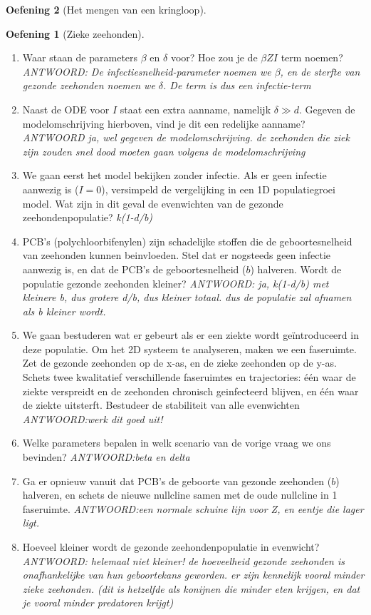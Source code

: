 \documentclass[
  a4paper,
]{scrbook}
\theoremstyle{definition}
\newtheorem{exercise}{Oefening}[chapter]
\theoremstyle{remark}
\begin{document}
\begin{exercise}[Het mengen van een
kringloop]
\begin{exercise}[Zieke
zeehonden]
\begin{enumerate}
\def\labelenumi{\alph{enumi}.}
\item
  Waar staan de parameters \(\beta\) en \(\delta\) voor? Hoe zou je de
  \(\beta ZI\) term noemen? \emph{ANTWOORD: De
  infectiesnelheid-parameter noemen we \(\beta\), en de sterfte van
  gezonde zeehonden noemen we \(\delta\). De term is dus een
  infectie-term}
\item
  Naast de ODE voor \(I\) staat een extra aanname, namelijk
  \(\delta \gg d\). Gegeven de modelomschrijving hierboven, vind je dit
  een redelijke aanname? \emph{ANTWOORD ja, wel gegeven de
  modelomschrijving. de zeehonden die ziek zijn zouden snel dood moeten
  gaan volgens de modelomschrijving}
\item
  We gaan eerst het model bekijken zonder infectie. Als er geen infectie
  aanwezig is (\(I=0\)), versimpeld de vergelijking in een 1D
  populatiegroei model. Wat zijn in dit geval de evenwichten van de
  gezonde zeehondenpopulatie? \emph{k(1-d/b)}
\item
  PCB's (polychloorbifenylen) zijn schadelijke stoffen die de
  geboortesnelheid van zeehonden kunnen beinvloeden. Stel dat er
  nogsteeds geen infectie aanwezig is, en dat de PCB's de
  geboortesnelheid (\(b\)) halveren. Wordt de populatie gezonde
  zeehonden kleiner? \emph{ANTWOORD: ja, k(1-d/b) met kleinere b, dus
  grotere d/b, dus kleiner totaal. dus de populatie zal afnamen als b
  kleiner wordt.}
\item
  We gaan bestuderen wat er gebeurt als er een ziekte wordt
  geïntroduceerd in deze populatie. Om het 2D systeem te analyseren,
  maken we een faseruimte. Zet de gezonde zeehonden op de x-as, en de
  zieke zeehonden op de y-as. Schets twee kwalitatief verschillende
  faseruimtes en trajectories: één waar de ziekte verspreidt en de
  zeehonden chronisch geinfecteerd blijven, en één waar de ziekte
  uitsterft. Bestudeer de stabiliteit van alle evenwichten
  \emph{ANTWOORD:werk dit goed uit!}
\item
  Welke parameters bepalen in welk scenario van de vorige vraag we ons
  bevinden? \emph{ANTWOORD:beta en delta}
\item
  Ga er opnieuw vanuit dat PCB's de geboorte van gezonde zeehonden
  (\(b\)) halveren, en schets de nieuwe nullcline samen met de oude
  nullcline in 1 faseruimte. \emph{ANTWOORD:een normale schuine lijn
  voor Z, en eentje die lager ligt.}
\item
  Hoeveel kleiner wordt de gezonde zeehondenpopulatie in evenwicht?
  \emph{ANTWOORD: helemaal niet kleiner! de hoeveelheid gezonde
  zeehonden is onafhankelijke van hun geboortekans geworden. er zijn
  kennelijk vooral minder zieke zeehonden. (dit is hetzelfde als
  konijnen die minder eten krijgen, en dat je vooral minder predatoren
  krijgt)}
\end{enumerate}


\end{exercise}
\end{exercise}
\end{document}
